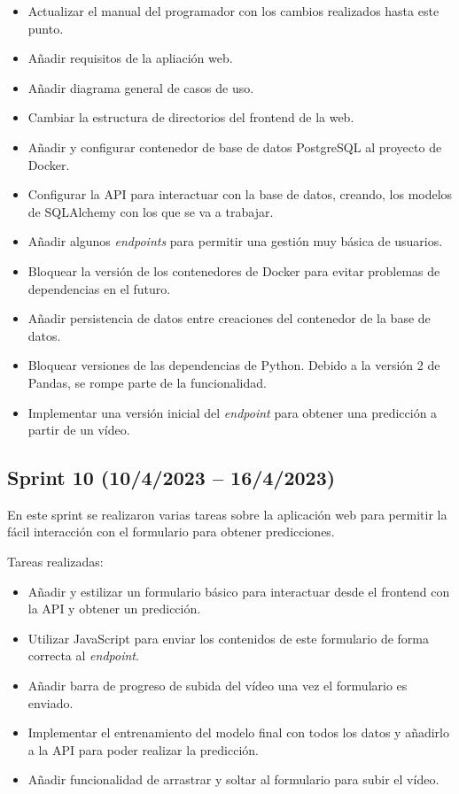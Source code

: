 \begin{itemize}
    \item Actualizar el manual del programador con los cambios realizados hasta
    este punto.
    \item Añadir requisitos de la apliación web.
    \item Añadir diagrama general de casos de uso.
    \item Cambiar la estructura de directorios del frontend de la web.
    \item Añadir y configurar contenedor de base de datos PostgreSQL al proyecto
    de Docker.
    \item Configurar la API para interactuar con la base de datos, creando, los
    modelos de SQLAlchemy con los que se va a trabajar.
    \item Añadir algunos \textit{endpoints} para permitir una gestión muy básica de
    usuarios.
    \item Bloquear la versión de los contenedores de Docker para evitar
    problemas de dependencias en el futuro.
    \item Añadir persistencia de datos entre creaciones del contenedor de la
    base de datos.
    \item Bloquear versiones de las dependencias de Python. Debido a la versión
    2 de Pandas, se rompe parte de la funcionalidad.
    \item Implementar una versión inicial del \textit{endpoint} para obtener una
    predicción a partir de un vídeo.
\end{itemize}

\subsection{Sprint 10 (10/4/2023 -- 16/4/2023)}

En este sprint se realizaron varias tareas sobre la aplicación web para permitir
la fácil interacción con el formulario para obtener predicciones.

Tareas realizadas:

\begin{itemize}
    \item Añadir y estilizar un formulario básico para interactuar desde el frontend con la
    API y obtener un predicción.
    \item Utilizar JavaScript para enviar los contenidos de este formulario de
    forma correcta al \textit{endpoint}.
    \item Añadir barra de progreso de subida del vídeo una vez el formulario es enviado.
    \item Implementar el entrenamiento del modelo final con todos los datos y
    añadirlo a la API para poder realizar la predicción.
    \item Añadir funcionalidad de arrastrar y soltar al formulario para subir el
    vídeo.
\end{itemize}

